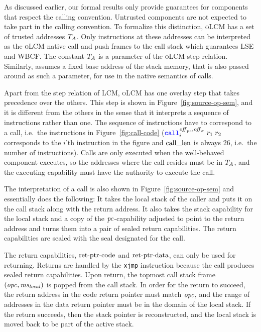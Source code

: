 \documentclass[acmsmall,review,showframe]{acmart}\settopmatter{printfolios=true,printccs=false,printacmref=false}
\newcommand{\trgcm}{\textsc{LCM}}
\newcommand{\srccm}{\textsc{oLCM}}
\begin{document}
As discussed earlier, our formal results only provide guarantees for components that respect the calling convention.
Untrusted components are not expected to take part in the calling convention.
To formalize this distinction, \srccm{} has a set of trusted addresses $T_{A}$.
Only instructions at these addresses can be interpreted as the \srccm{} native call and push frames to the call stack which guarantees LSE and WBCF.
The constant $T_{A}$ is a parameter of the \srccm{} step relation.
Similarly, \stktokens{} assumes a fixed base address of the stack memory, that is also passed around as such a parameter, for use in the native semantics of calls.

Apart from the step relation of \trgcm{}, \srccm{} has one overlay step that takes precedence over the others.
This step is shown in Figure~\ref{fig:source-op-sem}, and it is different from the others in the sense that it interprets a sequence of instructions rather than one.
The sequence of instructions have to correspond to a call, i.e.\ the
instructions in Figure~\ref{fig:call-code} ({\footnotesize  $\scall[i]{\offpc,\offsigma}{r_1}{r_2}$} corresponds to the $i$'th instruction in the figure and $\mathrm{call\_len}$ is always $26$, i.e.\ the number of instructions).
Calls are only executed when the well-behaved component executes, so the addresses where the call resides must be in $T_{A}$, and the executing capability must have the authority to execute the call.

The interpretation of a call is also shown in Figure~\ref{fig:source-op-sem} and essentially does the following: It takes the local stack of the caller and puts it on the call stack along with the return address.
It also takes the stack capability for the local stack and a copy of the $\mathit{pc}$-capability adjusted to point to the return address and turns them into a pair of sealed return capabilities.
The return capabilities are sealed with the seal designated for the call.

The return capabilities, $\mathrm{ret\text{-}ptr\text{-}code}$ and $\mathrm{ret\text{-}ptr\text{-}data}$, can only be used for returning.
Returns are handled by the \texttt{xjmp} instruction because the call produces sealed return capabilities.
Upon return, the topmost call stack frame $(\mathit{opc},\mathit{ms}_{\mathit{local}})$ is popped from the call stack.
In order for the return to succeed, the return address in the code return pointer must match $\mathit{opc}$, and the range of addresses in the data return pointer must be in the domain of the local stack.
If the return succeeds, then the stack pointer is reconstructed, and the local stack is moved back to be part of the active stack.
\end{document}
